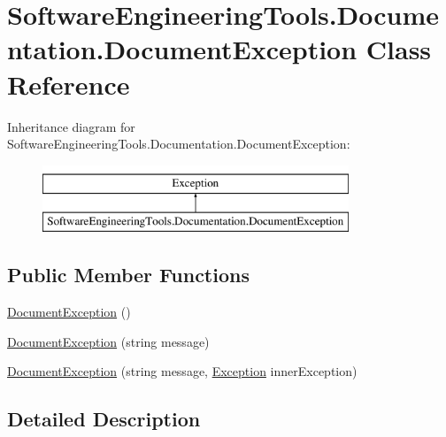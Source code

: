 \hypertarget{class_software_engineering_tools_1_1_documentation_1_1_document_exception}{\section{Software\+Engineering\+Tools.\+Documentation.\+Document\+Exception Class Reference}
\label{class_software_engineering_tools_1_1_documentation_1_1_document_exception}
}
Inheritance diagram for Software\+Engineering\+Tools.\+Documentation.\+Document\+Exception\+:\begin{figure}[H]
\begin{center}
\leavevmode
\includegraphics[height=2.000000cm]{class_software_engineering_tools_1_1_documentation_1_1_document_exception}
\end{center}
\end{figure}
\subsection*{Public Member Functions}
\begin{DoxyCompactItemize}
\item 
\hyperlink{class_software_engineering_tools_1_1_documentation_1_1_document_exception_a58122280f1857a8fbc9f0827ca096d6c}{Document\+Exception} ()
\item 
\hyperlink{class_software_engineering_tools_1_1_documentation_1_1_document_exception_af8026ba267419e75df82a02cd25648a8}{Document\+Exception} (string message)
\item 
\hyperlink{class_software_engineering_tools_1_1_documentation_1_1_document_exception_ac268dd481c1d85bf7abb917c0ca6b9e0}{Document\+Exception} (string message, \hyperlink{namespace_software_engineering_tools_1_1_documentation_aae490e51e07ef6e5540a2f2c04fccbb1ab0d4998a26f5b5742ad38c4af8817e32}{Exception} inner\+Exception)
\end{DoxyCompactItemize}


\subsection{Detailed Description}


